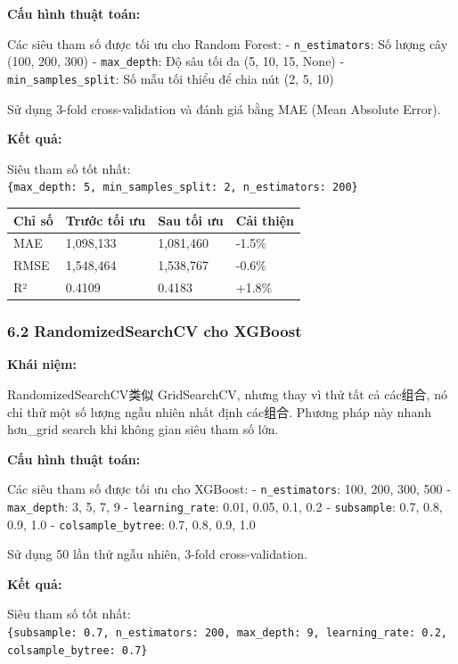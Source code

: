 \documentclass[11pt]{article}
\begin{document}
\textbf{Cấu hình thuật toán:}

Các siêu tham số được tối ưu cho Random Forest: -
\texttt{n\_estimators}: Số lượng cây (100, 200, 300) -
\texttt{max\_depth}: Độ sâu tối đa (5, 10, 15, None) -
\texttt{min\_samples\_split}: Số mẫu tối thiểu để chia nút (2, 5, 10)

Sử dụng 3-fold cross-validation và đánh giá bằng MAE (Mean Absolute
Error).

\textbf{Kết quả:}

Siêu tham số tốt nhất:
\texttt{\{\textquotesingle{}max\_depth\textquotesingle{}:\ 5,\ \textquotesingle{}min\_samples\_split\textquotesingle{}:\ 2,\ \textquotesingle{}n\_estimators\textquotesingle{}:\ 200\}}

\begin{longtable}[]{@{}llll@{}}
\toprule\noalign{}
Chỉ số & Trước tối ưu & Sau tối ưu & Cải thiện \\
\midrule\noalign{}
\endhead
\bottomrule\noalign{}
\endlastfoot
MAE & 1,098,133 & 1,081,460 & -1.5\% \\
RMSE & 1,548,464 & 1,538,767 & -0.6\% \\
R² & 0.4109 & 0.4183 & +1.8\% \\
\end{longtable}

\subsubsection{6.2 RandomizedSearchCV cho
XGBoost}\label{randomizedsearchcv-cho-xgboost}

\textbf{Khái niệm:}

RandomizedSearchCV类似 GridSearchCV, nhưng thay vì thử tất cả các组合,
nó chỉ thử một số lượng ngẫu nhiên nhất định các组合. Phương pháp này
nhanh hơn\_grid search khi không gian siêu tham số lớn.

\textbf{Cấu hình thuật toán:}

Các siêu tham số được tối ưu cho XGBoost: - \texttt{n\_estimators}: 100,
200, 300, 500 - \texttt{max\_depth}: 3, 5, 7, 9 -
\texttt{learning\_rate}: 0.01, 0.05, 0.1, 0.2 - \texttt{subsample}: 0.7,
0.8, 0.9, 1.0 - \texttt{colsample\_bytree}: 0.7, 0.8, 0.9, 1.0

Sử dụng 50 lần thử ngẫu nhiên, 3-fold cross-validation.

\textbf{Kết quả:}

Siêu tham số tốt nhất:
\texttt{\{\textquotesingle{}subsample\textquotesingle{}:\ 0.7,\ \textquotesingle{}n\_estimators\textquotesingle{}:\ 200,\ \textquotesingle{}max\_depth\textquotesingle{}:\ 9,\ \textquotesingle{}learning\_rate\textquotesingle{}:\ 0.2,\ \textquotesingle{}colsample\_bytree\textquotesingle{}:\ 0.7\}}
\end{document}
